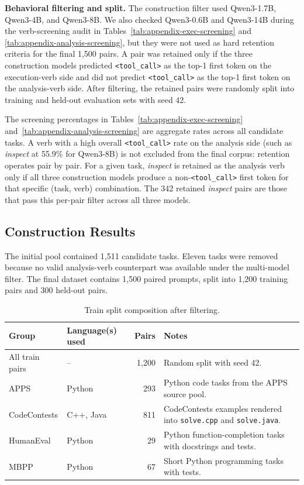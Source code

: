 \textbf{Behavioral filtering and split.}
The construction filter used Qwen3-1.7B, Qwen3-4B, and Qwen3-8B. We also
checked Qwen3-0.6B and Qwen3-14B during the verb-screening audit in
Tables~\ref{tab:appendix-exec-screening} and
\ref{tab:appendix-analysis-screening}, but they were not used as hard
retention criteria for the final 1,500 pairs. A pair was retained only if the three construction models predicted
\texttt{<tool\_call>} as the top-1 first token on the execution-verb side and
did not predict \texttt{<tool\_call>} as the top-1 first token on the
analysis-verb side. After filtering, the retained pairs were randomly split
into training and held-out evaluation sets with seed 42.

The screening percentages in Tables~\ref{tab:appendix-exec-screening}
and~\ref{tab:appendix-analysis-screening} are aggregate rates across all
candidate tasks. A verb with a high overall \texttt{<tool\_call>} rate on the
analysis side (such as \textit{inspect} at 55.9\% for Qwen3-8B) is not
excluded from the final corpus: retention operates pair by pair. For a given
task, \textit{inspect} is retained as the analysis verb only if all three
construction models produce a non-\texttt{<tool\_call>} first token for that
specific (task, verb) combination. The 342 retained \textit{inspect} pairs are
those that pass this per-pair filter across all three models.

\subsection{Construction Results}
\label{appendix:dataset:results}

The initial pool contained 1,511 candidate tasks. Eleven tasks were removed
because no valid analysis-verb counterpart was available under the multi-model
filter. The final dataset contains 1,500 paired prompts, split into 1,200
training pairs and 300 held-out pairs.

\begin{table}[h]
\centering
\scriptsize
\caption{Train split composition after filtering.}
\label{tab:appendix-train-summary}
\begin{tabularx}{\linewidth}{llrX}
\toprule
Group & Language(s) used & Pairs & Notes \\
\midrule
All train pairs & -- & 1,200 & Random split with seed 42. \\
APPS & Python & 293 & Python code tasks from the APPS source pool. \\
CodeContests & C++, Java & 811 & CodeContests examples rendered into \texttt{solve.cpp} and \texttt{solve.java}. \\
HumanEval & Python & 29 & Python function-completion tasks with docstrings and tests. \\
MBPP & Python & 67 & Short Python programming tasks with tests. \\
\bottomrule
\end{tabularx}
\end{table}


